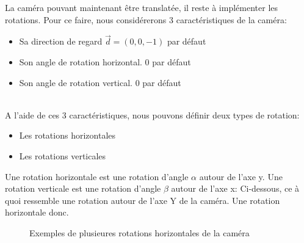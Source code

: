 \documentclass[11pt]{article}
\begin{document}
La caméra pouvant maintenant être translatée, il reste à implémenter les rotations. Pour ce faire, nous considérerons 3 caractéristiques de la caméra:
\begin{itemize}
	\item{Sa direction de regard $\overrightarrow{d} = (0, 0, -1)$ par défaut}
	\item{Son angle de rotation horizontal. 0 par défaut}
	\item{Son angle de rotation vertical. 0 par défaut}
\end{itemize}
\hfill\\
A l'aide de ces 3 caractéristiques, nous pouvons définir deux types de rotation:
\begin{itemize}
	\item{Les rotations horizontales}
	\item{Les rotations verticales}
\end{itemize}

Une rotation horizontale est une rotation d'angle $\alpha$ autour de l'axe y. Une rotation verticale est une rotation d'angle $\beta$ autour de l'axe x:
Ci-dessous, ce à quoi ressemble une rotation autour de l'axe Y de la caméra. Une rotation horizontale donc.

\begin{figure}[h!]

	\caption{Exemples de plusieures rotations horizontales de la caméra}
	\label{rotationCameraY}
\end{figure}
\FloatBarrier
\end{document}
